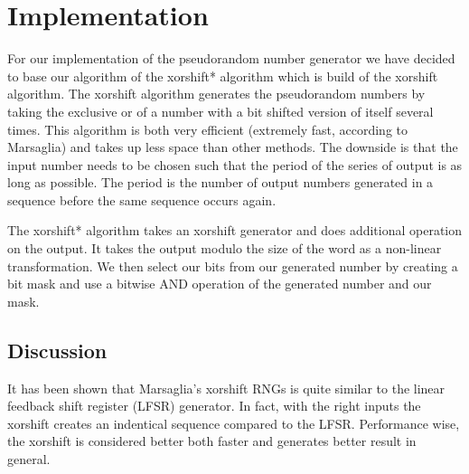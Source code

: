 \section{Implementation}
For our implementation of the pseudorandom number generator we have decided to base our algorithm of the xorshift* algorithm which is build of the xorshift algorithm\cite{xorshift}. The xorshift algorithm generates the pseudorandom numbers by taking the exclusive or of a number with a bit shifted version of itself several times. This algorithm is both very efficient (extremely fast, according to Marsaglia) and takes up less space than other methods. The downside is that the input number needs to be chosen such that the period of the series of output is as long as possible. The period is the number of output numbers generated in a sequence before the same sequence occurs again. 

The xorshift* algorithm takes an xorshift generator and does additional operation on the output. It takes the output modulo the size of the word as a non-linear transformation. We then select our bits from our generated number by creating a bit mask and use a bitwise AND operation of the generated number and our mask.

\subsection{Discussion}
It has been shown that Marsaglia's xorshift RNGs is quite similar to the linear feedback shift register (LFSR) generator\cite{brent}. In fact, with the right inputs the xorshift creates an indentical sequence compared to the LFSR. Performance wise, the xorshift is considered better both faster and generates better result in general.

